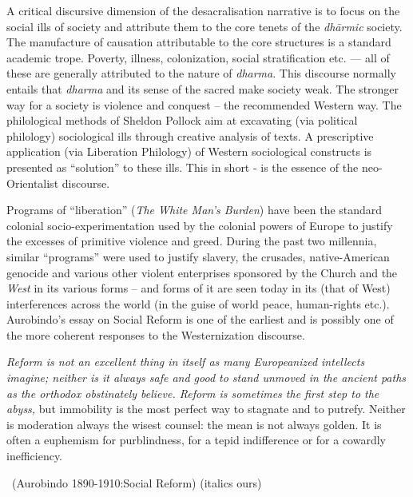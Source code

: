 A critical discursive dimension of the desacralisation narrative is to focus on the social ills of society and attribute them to the core tenets of the \textit{dhārmic} society. The manufacture of causation attributable to the core structures is a standard academic trope. Poverty, illness, colonization, social stratification etc. — all of these are generally attributed to the nature of \textit{dharma}. This discourse normally entails that \textit{dharma} and its sense of the sacred make society weak. The stronger way for a society is violence and conquest – the recommended Western way. The philological methods of Sheldon Pollock aim at excavating (via political philology) sociological ills through creative analysis of texts. A prescriptive application (via Liberation Philology) of Western sociological constructs is presented as “solution” to these ills. This in short - is the essence of the neo-Orientalist discourse.

Programs of “liberation” (\textit{The White Man's Burden}) have been the standard colonial socio-experimentation used by the colonial powers of Europe to justify the excesses of primitive violence and greed. During the past two millennia, similar “programs” were used to justify slavery, the crusades, native-American genocide and various other violent enterprises sponsored by the Church and the \textit{West} in its various forms – and forms of it are seen today in its (that of West) interferences across the world (in the guise of world peace, human-rights etc.). Aurobindo's essay on Social Reform is one of the earliest and is possibly one of the more coherent responses to the Westernization discourse.

\begin{myquote}
\textit{Reform is not an excellent thing in itself as many Europeanized intellects imagine; neither is it always safe and good to stand unmoved in the ancient paths as the orthodox obstinately believe. Reform is sometimes the first step to the abyss,} but immobility is the most perfect way to stagnate and to putrefy. Neither is moderation always the wisest counsel: the mean is not always golden. It is often a euphemism for purblindness, for a tepid indifference or for a cowardly inefficiency. 

~\hfill (Aurobindo 1890-1910:Social Reform) (italics ours)
\end{myquote}

